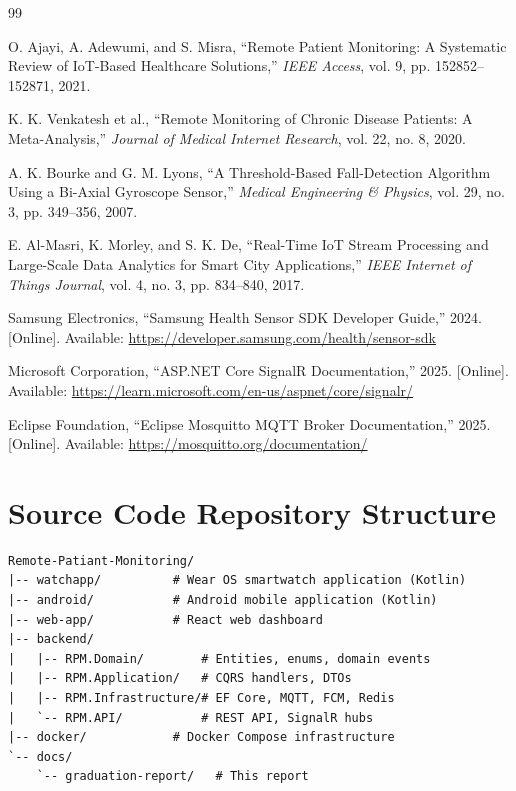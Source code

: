 \documentclass[12pt,a4paper]{report}
\begin{document}
\begin{thebibliography}{99}

O. Ajayi, A. Adewumi, and S. Misra, ``Remote Patient Monitoring: A Systematic Review of IoT-Based Healthcare Solutions,'' \textit{IEEE Access}, vol. 9, pp. 152852--152871, 2021.

K. K. Venkatesh et al., ``Remote Monitoring of Chronic Disease Patients: A Meta-Analysis,'' \textit{Journal of Medical Internet Research}, vol. 22, no. 8, 2020.

A. K. Bourke and G. M. Lyons, ``A Threshold-Based Fall-Detection Algorithm Using a Bi-Axial Gyroscope Sensor,'' \textit{Medical Engineering \& Physics}, vol. 29, no. 3, pp. 349--356, 2007.

E. Al-Masri, K. Morley, and S. K. De, ``Real-Time IoT Stream Processing and Large-Scale Data Analytics for Smart City Applications,'' \textit{IEEE Internet of Things Journal}, vol. 4, no. 3, pp. 834--840, 2017.

Samsung Electronics, ``Samsung Health Sensor SDK Developer Guide,'' 2024. [Online]. Available: \url{https://developer.samsung.com/health/sensor-sdk}

Microsoft Corporation, ``ASP.NET Core SignalR Documentation,'' 2025. [Online]. Available: \url{https://learn.microsoft.com/en-us/aspnet/core/signalr/}

Eclipse Foundation, ``Eclipse Mosquitto MQTT Broker Documentation,'' 2025. [Online]. Available: \url{https://mosquitto.org/documentation/}

\end{thebibliography}

\appendix
\chapter{Source Code Repository Structure}

\begin{verbatim}
Remote-Patiant-Monitoring/
|-- watchapp/          # Wear OS smartwatch application (Kotlin)
|-- android/           # Android mobile application (Kotlin)
|-- web-app/           # React web dashboard
|-- backend/
|   |-- RPM.Domain/        # Entities, enums, domain events
|   |-- RPM.Application/   # CQRS handlers, DTOs
|   |-- RPM.Infrastructure/# EF Core, MQTT, FCM, Redis
|   `-- RPM.API/           # REST API, SignalR hubs
|-- docker/            # Docker Compose infrastructure
`-- docs/
    `-- graduation-report/   # This report
\end{verbatim}
\end{document}
